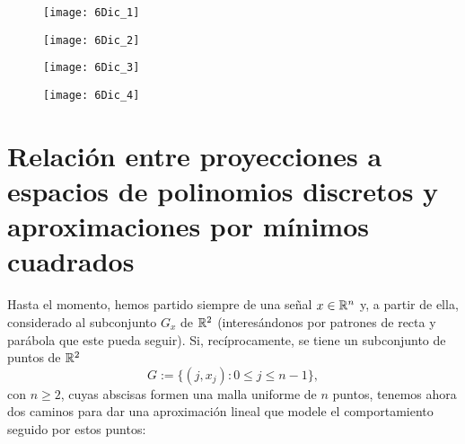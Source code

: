 \begin{ejemplo}
\begin{figure}[H]
	\centering
	\texttt{[image: 6Dic\_1]}
\end{figure}

\begin{figure}[H]
	\centering
	\texttt{[image: 6Dic\_2]}
\end{figure}

\begin{figure}[H]
	\centering
	\texttt{[image: 6Dic\_3]}
\end{figure}

\begin{figure}[H]
	\centering
	\texttt{[image: 6Dic\_4]}
\end{figure}


\final
\end{ejemplo}






\section{Relación entre proyecciones a espacios de polinomios discretos y aproximaciones por mínimos cuadrados}
\label{Relación entre proyecciones a espacios de polinomios discretos y aproximaciones por mínimos cuadrados}

Hasta el momento, hemos partido siempre
de una señal $x \in \mathbb{R}^{n}$
y, a partir de ella, considerado al subconjunto $G_{x}$ 
de $\mathbb{R}^{2}$ (interesándonos por patrones de 
recta y parábola que este pueda seguir).
Si, recíprocamente, se tiene un 
subconjunto de puntos de $\mathbb{R}^{2}$ 
\begin{equation}
\label{eq: Halloween!}
G:=\{(j, x_{j}): 0 \leq j \leq n-1 \},
\end{equation}
con $n \geq 2$,
cuyas abscisas formen una malla uniforme
de $n$ puntos, tenemos ahora dos caminos
para dar una aproximación lineal
que modele el comportamiento 
seguido por estos puntos:

